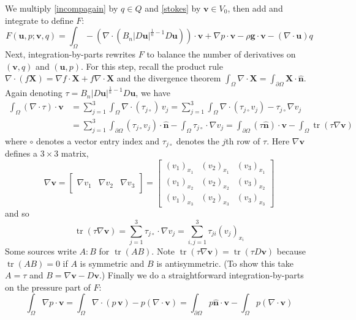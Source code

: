 \documentclass[letterpaper,final,12pt,reqno]{amsart}
\newcommand{\grad}{\nabla}
\newcommand{\trace}{\operatorname{tr}}
\newcommand{\hbn}{\hat{\mathbf{n}}}
\newcommand{\bu}{\mathbf{u}}
\newcommand{\bv}{\mathbf{v}}
\newcommand{\bX}{\mathbf{X}}
\begin{document}
We multiply \eqref{incompagain} by $q\in Q$ and \eqref{stokes} by $\bv\in V_0$, then add and integrate to define $F$:
\begin{equation}
F(\bu,p;\bv,q) = \int_\Omega - \left(\nabla \cdot \left(B_n |D\bu|^{\frac{1}{n} - 1} D\bu\right)\right)\cdot \bv + \nabla p \cdot \bv - \rho \mathbf{g} \cdot \bv - \left(\nabla \cdot \bu\right) q \label{nonfuncone}
\end{equation}
Next, integration-by-parts rewrites $F$ to balance the number of derivatives on $(\bv,q)$ and $(\bu,p)$.  For this step, recall the product rule $\nabla \cdot(f\bX) = \grad f\cdot \bX + f \nabla \cdot \bX$ and the divergence theorem $\int_\Omega \nabla \cdot \bX = \int_{\partial \Omega} \bX \cdot \hbn$.  Again denoting $\tau = B_n |D\bu|^{\frac{1}{n} - 1} D\bu$, we have
\begin{align*}
\int_\Omega \left(\nabla \cdot \tau\right)\cdot \bv &= \sum_{j=1}^3 \int_\Omega \nabla \cdot (\tau_{j\circ})\, v_j = \sum_{j=1}^3 \int_\Omega \nabla \cdot (\tau_{j\circ} v_j) - \tau_{j\circ} \nabla v_j \\
  &= \sum_{j=1}^3 \int_{\partial \Omega} (\tau_{j\circ} v_j) \cdot \hbn - \int_\Omega \tau_{j\circ} \cdot \nabla v_j = \int_{\partial \Omega} (\tau \hbn)\cdot \bv - \int_\Omega \trace(\tau \nabla \bv)
\end{align*}
where $\circ$ denotes a vector entry index and $\tau_{j\circ}$ denotes the $j$th row of $\tau$.  Here $\grad\bv$ defines a $3\times 3$ matrix,
\newcommand{\trefthree}[3]{\left[\begin{array}{c|c|c} & & \\ #1 & #2 & #3 \\ & & \end{array}\right]}
    $$\grad \bv = \trefthree{\grad v_1}{\grad v_2}{\grad v_3} = \begin{bmatrix}
    (v_1)_{x_1} & (v_2)_{x_1} & (v_3)_{x_1} \\
    (v_1)_{x_2} & (v_2)_{x_2} & (v_3)_{x_2} \\
    (v_1)_{x_3} & (v_2)_{x_3} & (v_3)_{x_3}
    \end{bmatrix}$$
and so
    $$\trace(\tau \grad \bv) = \sum_{j=1}^3 \tau_{j\circ} \cdot \grad v_j = \sum_{i,j=1}^3 \tau_{ji} (v_j)_{x_i}$$
Some sources \cite{JouvetRappaz2011} write $A:B$ for $\trace(AB)$.  Note $\trace(\tau \grad \bv) = \trace(\tau D\bv)$ because $\trace(AB)=0$ if $A$ is symmetric and $B$ is antisymmetric.  (To show this take $A=\tau$ and $B=\grad\bv-D\bv$.)  Finally we do a straightforward integration-by-parts on the pressure part of $F$:
    $$\int_\Omega \nabla p \cdot \bv = \int_\Omega \nabla\cdot (p\,\bv) - p (\nabla \cdot \bv) = \int_{\partial \Omega} p\hbn \cdot \bv - \int_\Omega p (\nabla \cdot \bv)$$
\end{document}
